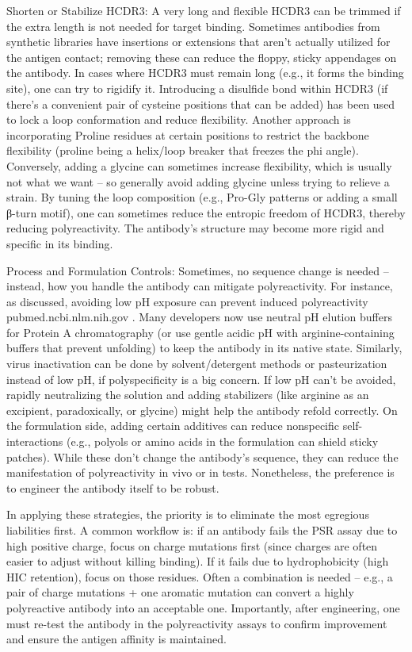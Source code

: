 Shorten or Stabilize HCDR3: A very long and flexible HCDR3 can be trimmed if the extra length is not needed for target binding. Sometimes antibodies from synthetic libraries have insertions or extensions that aren’t actually utilized for the antigen contact; removing these can reduce the floppy, sticky appendages on the antibody. In cases where HCDR3 must remain long (e.g., it forms the binding site), one can try to rigidify it. Introducing a disulfide bond within HCDR3 (if there’s a convenient pair of cysteine positions that can be added) has been used to lock a loop conformation and reduce flexibility. Another approach is incorporating Proline residues at certain positions to restrict the backbone flexibility (proline being a helix/loop breaker that freezes the phi angle). Conversely, adding a glycine can sometimes increase flexibility, which is usually not what we want – so generally avoid adding glycine unless trying to relieve a strain. By tuning the loop composition (e.g., Pro-Gly patterns or adding a small β-turn motif), one can sometimes reduce the entropic freedom of HCDR3, thereby reducing polyreactivity. The antibody’s structure may become more rigid and specific in its binding.

Process and Formulation Controls: Sometimes, no sequence change is needed – instead, how you handle the antibody can mitigate polyreactivity. For instance, as discussed, avoiding low pH exposure can prevent induced polyreactivity
pubmed.ncbi.nlm.nih.gov
. Many developers now use neutral pH elution buffers for Protein A chromatography (or use gentle acidic pH with arginine-containing buffers that prevent unfolding) to keep the antibody in its native state. Similarly, virus inactivation can be done by solvent/detergent methods or pasteurization instead of low pH, if polyspecificity is a big concern. If low pH can’t be avoided, rapidly neutralizing the solution and adding stabilizers (like arginine as an excipient, paradoxically, or glycine) might help the antibody refold correctly. On the formulation side, adding certain additives can reduce nonspecific self-interactions (e.g., polyols or amino acids in the formulation can shield sticky patches). While these don’t change the antibody’s sequence, they can reduce the manifestation of polyreactivity in vivo or in tests. Nonetheless, the preference is to engineer the antibody itself to be robust.

In applying these strategies, the priority is to eliminate the most egregious liabilities first. A common workflow is: if an antibody fails the PSR assay due to high positive charge, focus on charge mutations first (since charges are often easier to adjust without killing binding). If it fails due to hydrophobicity (high HIC retention), focus on those residues. Often a combination is needed – e.g., a pair of charge mutations + one aromatic mutation can convert a highly polyreactive antibody into an acceptable one. Importantly, after engineering, one must re-test the antibody in the polyreactivity assays to confirm improvement and ensure the antigen affinity is maintained.

